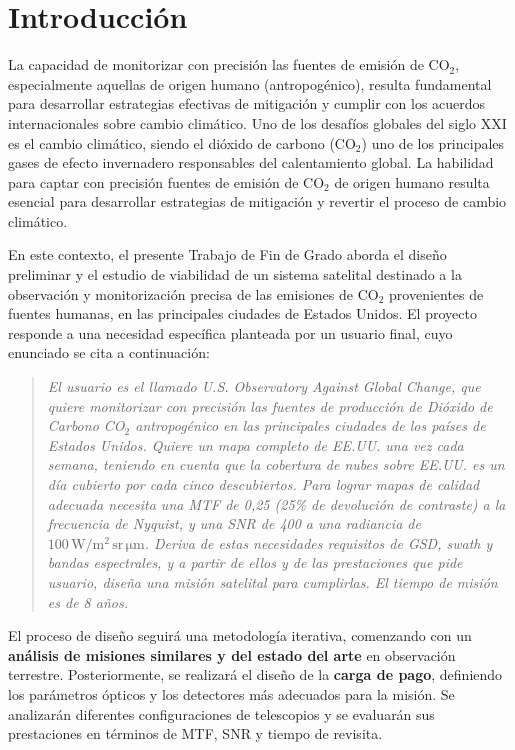 \chapter{Introducción}

La capacidad de monitorizar con precisión las fuentes de emisión de CO$_2$, especialmente aquellas de origen humano (antropogénico), resulta fundamental para desarrollar estrategias efectivas de mitigación y cumplir con los acuerdos internacionales sobre cambio climático.
Uno de los desafíos globales del siglo XXI es el cambio climático, siendo el dióxido de carbono (CO$_2$) uno de los principales gases de efecto invernadero responsables del calentamiento global. La habilidad para captar con precisión fuentes de emisión de CO$_2$ de origen humano resulta esencial para desarrollar estrategias de mitigación y revertir el proceso de cambio climático.


En este contexto, el presente Trabajo de Fin de Grado aborda el diseño preliminar y el estudio de viabilidad de un sistema satelital destinado a la observación y monitorización precisa de las emisiones de CO$_2$  provenientes de fuentes humanas, en las principales ciudades de Estados Unidos. El proyecto responde a una necesidad específica planteada por un usuario final, cuyo enunciado se cita a continuación:


\begin{quote}
\textit{El usuario es el llamado U.S. Observatory Against Global Change, que quiere monitorizar con precisión las fuentes de producción de Dióxido de Carbono CO$_2$ antropogénico en las principales ciudades de los países de Estados Unidos. Quiere un mapa completo de EE.UU. una vez cada semana, teniendo en cuenta que la cobertura de nubes sobre EE.UU. es un día cubierto por cada cinco descubiertos. Para lograr mapas de calidad adecuada necesita una MTF de 0,25 (25\% de devolución de contraste) a la frecuencia de Nyquist, y una SNR de 400 a una radiancia de $100\,\mathrm{W/m^2\,sr\,\mu m}$. Deriva de estas necesidades requisitos de GSD, swath y bandas espectrales, y a partir de ellos y de las prestaciones que pide usuario, diseña una misión satelital para cumplirlas. El tiempo de misión es de 8 años.}
\end{quote}

El proceso de diseño seguirá una metodología iterativa, comenzando con un \textbf{análisis de misiones similares y del estado del arte} en observación terrestre. Posteriormente, se realizará el diseño de la \textbf{carga de pago}, definiendo los parámetros ópticos y los detectores más adecuados para la misión. Se analizarán diferentes configuraciones de telescopios y se evaluarán sus prestaciones en términos de MTF, SNR y tiempo de revisita.


